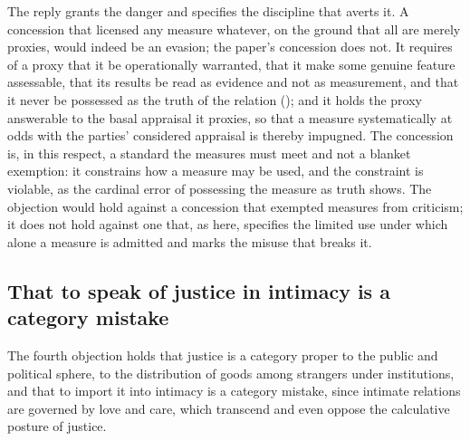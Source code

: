The reply grants the danger and specifies the discipline that averts it. A concession that licensed any measure whatever, on the ground that all are merely proxies, would indeed be an evasion; the paper's concession does not. It requires of a proxy that it be operationally warranted, that it make some genuine feature assessable, that its results be read as evidence and not as measurement, and that it never be possessed as the truth of the relation (); and it holds the proxy answerable to the basal appraisal it proxies, so that a measure systematically at odds with the parties' considered appraisal is thereby impugned. The concession is, in this respect, a standard the measures must meet and not a blanket exemption: it constrains how a measure may be used, and the constraint is violable, as the cardinal error of possessing the measure as truth shows. The objection would hold against a concession that exempted measures from criticism; it does not hold against one that, as here, specifies the limited use under which alone a measure is admitted and marks the misuse that breaks it.

\subsection{That to speak of justice in intimacy is a category mistake}
\label{p11:sec:obj-category}

The fourth objection holds that justice is a category proper to the public and political sphere, to the distribution of goods among strangers under institutions, and that to import it into intimacy is a category mistake, since intimate relations are governed by love and care, which transcend and even oppose the calculative posture of justice.

